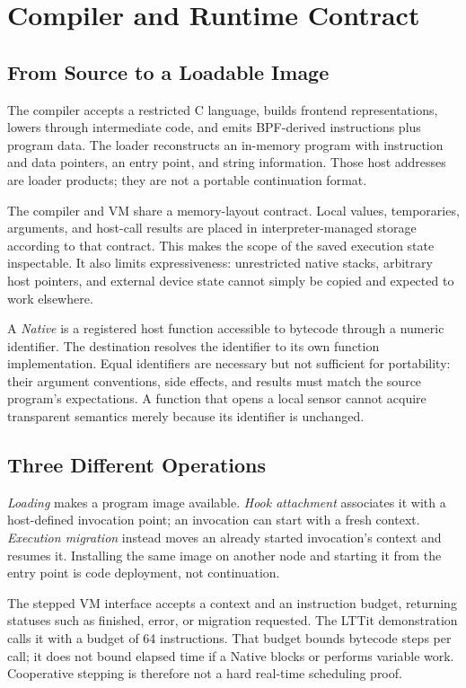 \documentclass[conference,letterpaper]{IEEEtran}
\begin{document}
\section{Compiler and Runtime Contract}
\subsection{From Source to a Loadable Image}
The compiler accepts a restricted C language, builds frontend representations, lowers through intermediate code, and emits BPF-derived instructions plus program data. The loader reconstructs an in-memory program with instruction and data pointers, an entry point, and string information. Those host addresses are loader products; they are not a portable continuation format.

The compiler and VM share a memory-layout contract. Local values, temporaries, arguments, and host-call results are placed in interpreter-managed storage according to that contract. This makes the scope of the saved execution state inspectable. It also limits expressiveness: unrestricted native stacks, arbitrary host pointers, and external device state cannot simply be copied and expected to work elsewhere.

A \emph{Native} is a registered host function accessible to bytecode through a numeric identifier. The destination resolves the identifier to its own function implementation. Equal identifiers are necessary but not sufficient for portability: their argument conventions, side effects, and results must match the source program's expectations. A function that opens a local sensor cannot acquire transparent semantics merely because its identifier is unchanged.

\subsection{Three Different Operations}
\emph{Loading} makes a program image available. \emph{Hook attachment} associates it with a host-defined invocation point; an invocation can start with a fresh context. \emph{Execution migration} instead moves an already started invocation's context and resumes it. Installing the same image on another node and starting it from the entry point is code deployment, not continuation.

The stepped VM interface accepts a context and an instruction budget, returning statuses such as finished, error, or migration requested. The LTTit demonstration calls it with a budget of 64 instructions. That budget bounds bytecode steps per call; it does not bound elapsed time if a Native blocks or performs variable work. Cooperative stepping is therefore not a hard real-time scheduling proof.
\end{document}
